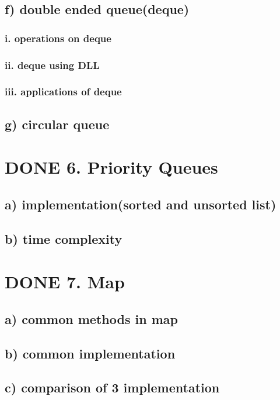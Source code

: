 \documentclass[11pt]{article}
\begin{document}
\subsection{f) double ended queue(deque)}
\label{sec:org44dbd5d}
\subsubsection{i. operations on deque}
\label{sec:org4a333da}
\subsubsection{ii. deque using DLL}
\label{sec:orge3e10a2}
\subsubsection{iii. applications of deque}
\label{sec:org1133269}
\subsection{g) circular queue}
\label{sec:org78c1d64}
\section{{\bfseries\sffamily DONE} 6. Priority Queues}
\label{sec:org6128428}
\subsection{a) implementation(sorted and unsorted list)}
\label{sec:org958d48f}
\subsection{b) time complexity}
\label{sec:org7341404}
\section{{\bfseries\sffamily DONE} 7. Map}
\label{sec:orgfb2262b}
\subsection{a) common methods in map}
\label{sec:orgeabae41}
\subsection{b) common implementation}
\label{sec:org4b1d404}
\subsection{c) comparison of 3 implementation}
\label{sec:orgc701ec1}
\end{document}
